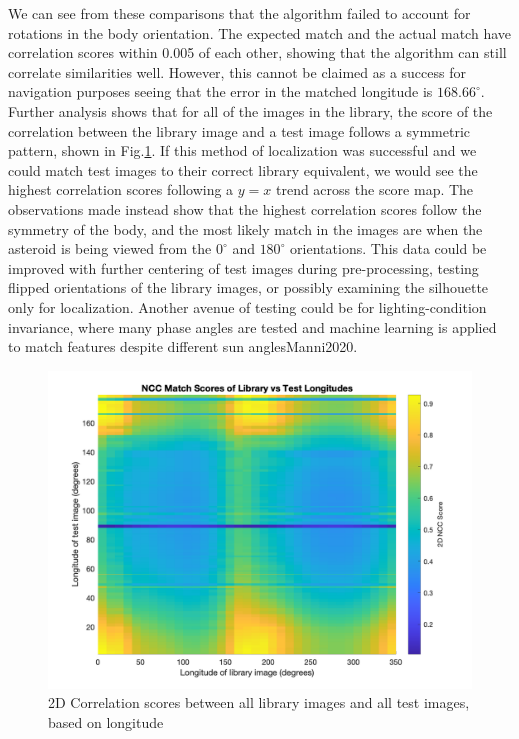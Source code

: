We can see from these comparisons that the algorithm failed to account for rotations in the body orientation. The expected match and the actual match have correlation scores within 0.005 of each other, showing that the algorithm can still correlate similarities well. However, this cannot be claimed as a success for navigation purposes seeing that the error in the matched longitude is $168.66^{\circ}$. Further analysis shows that for all of the images in the library, the score of the correlation between the library image and a test image follows a symmetric pattern, shown in Fig.\ref{fig:heatmap}. If this method of localization was successful and we could match test images to their correct library equivalent, we would see the highest correlation scores following a $y=x$ trend across the score map. The observations made instead show that the highest correlation scores follow the symmetry of the body, and the most likely match in the images are when the asteroid is being viewed from the $0^{\circ}$ and $180^{\circ}$ orientations. This data could be improved with further centering of test images during pre-processing, testing flipped orientations of the library images, or possibly examining the silhouette only for localization. Another avenue of testing could be for lighting-condition invariance, where many phase angles are tested and machine learning is applied to match features despite different sun angles{Manni2020}. 

\begin{figure}[ht!]
    \centering
    \includegraphics[width= 1.1\textwidth]{fig/all_scores.png}
    \caption{2D Correlation scores between all library images and all test images, based on longitude}
    \label{fig:heatmap}
\end{figure}

